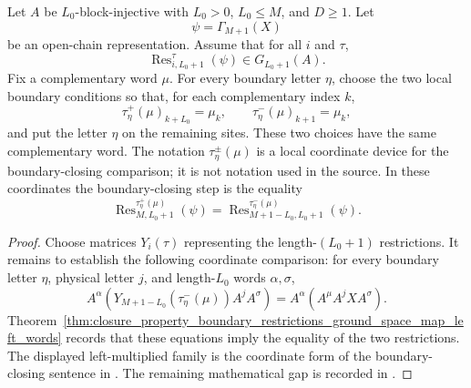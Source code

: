 \begin{theorem}
    \label{thm:closure_property_boundary_restrictions_ground_space_map}
    \leanok
    Let $A$ be $L_0$-block-injective with $L_0>0$, $L_0\le M$, and
    $D\ge1$. Let
    \[
        \psi=\Gamma_{M+1}(X)
    \]
    be an open-chain representation. Assume that for all $i$ and $\tau$,
    \[
        \operatorname{Res}^{\tau}_{i,L_0+1}(\psi)\in G_{L_0+1}(A).
    \]
    Fix a complementary word $\mu$. For every boundary letter $\eta$, choose the
    two local boundary conditions so that, for each complementary index $k$,
    \[
        \tau^+_\eta(\mu)_{k+L_0}=\mu_k,
        \qquad
        \tau^-_\eta(\mu)_{k+1}=\mu_k,
    \]
    and put the letter $\eta$ on the remaining sites. These two choices have the
    same complementary word. The notation $\tau^\pm_\eta(\mu)$ is a local
    coordinate device for the boundary-closing comparison; it is not notation
    used in the source. In these coordinates the boundary-closing step is the
    equality
    \[
        \operatorname{Res}^{\tau^+_\eta(\mu)}_{M,L_0+1}(\psi)
        =
        \operatorname{Res}^{\tau^-_\eta(\mu)}_{M+1-L_0,L_0+1}(\psi).
    \]
\end{theorem}

\begin{proof}
    \notready
    Choose matrices $Y_i(\tau)$ representing the length-$(L_0+1)$
    restrictions. It remains to establish the following coordinate comparison:
    for every boundary letter $\eta$, physical letter $j$, and length-$L_0$
    words $\alpha,\sigma$,
    \[
        A^\alpha
        \left(Y_{M+1-L_0}(\tau^-_\eta(\mu))A^jA^\sigma\right)
        =
        A^\alpha
        \left(A^\mu A^jXA^\sigma\right).
    \]
    Theorem~\ref{thm:closure_property_boundary_restrictions_ground_space_map_left_words}
    records that these equations imply the equality of the two restrictions.
    The displayed left-multiplied family is the coordinate form of the
    boundary-closing sentence in \cite[lines~2078--2079]{Cirac2021Matrix}.
    The remaining mathematical gap is recorded in
    .
\end{proof}

